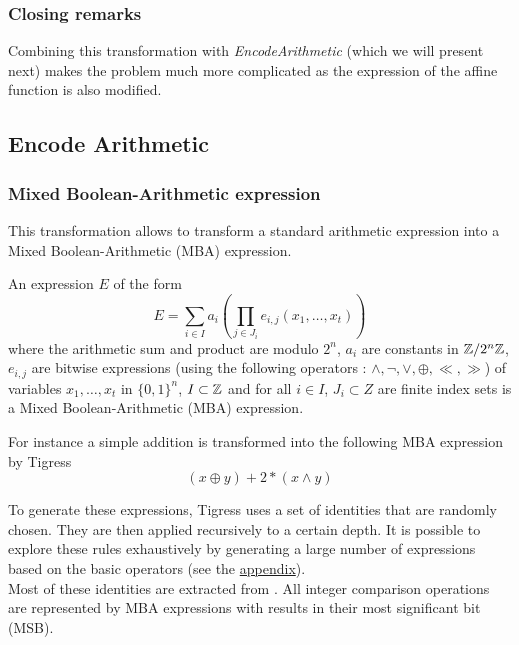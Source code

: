 \documentclass{projectreport}
\begin{document}
\subsubsection{Closing remarks}

Combining this transformation with \textit{EncodeArithmetic} (which we will present next) makes the problem much more complicated as the expression of the affine function is also modified.

\subsection{Encode Arithmetic}

\subsubsection{Mixed Boolean-Arithmetic expression}

This transformation allows to transform a standard arithmetic expression into a Mixed Boolean-Arithmetic (\textsf{MBA}) expression.

\begin{definition} An expression $E$ of the form
\begin{equation}
    E = \sum_{i \in I} a_i (\prod_{j \in J_i} e_{i, j}(x_1, \ldots, x_t ))
\end{equation}
where the arithmetic sum and product are modulo $2^n$, $a_i$ are constants in $\mathbb Z/2^n\mathbb Z$, $e_{i,j}$ are bitwise
expressions (using the following operators : $\wedge, \neg, \lor, \oplus, \ll, \gg$) of variables $x_1, \ldots, x_t $ in $\{0, 1\}^n$, $I \subset \mathbb Z $ and for all $i \in I$, $J_i \subset Z$ are finite index sets is a Mixed Boolean-Arithmetic (\textsf{MBA}) expression.

\end{definition}

\begin{example}
For instance a simple addition is transformed into the following \textsf{MBA} expression by Tigress
\begin{equation}
    (x \oplus y) + 2 * (x \land y) 
\end{equation}
\end{example}

To generate these expressions, Tigress uses a set of identities that are randomly chosen. They are then applied recursively to a certain depth. It is possible to explore these rules exhaustively by generating a large number of expressions based on the basic operators (see the  \hyperref[app:rules]{appendix}). \\
Most of these identities are extracted from \cite{HackersDelight}. All integer comparison operations are represented by \textsf{MBA} expressions with results in their most significant bit (\textsf{MSB}).
\end{document}
